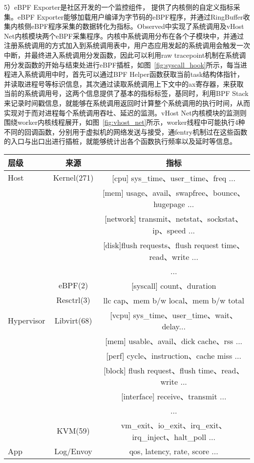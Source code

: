 5）eBPF Exporter是社区开发的一个监控组件， 提供了内核侧的自定义指标采集。eBPF Exporter能够加载用户编译为字节码的eBPF程序，并通过RingBuffer收集内核侧eBPF程序采集的数据转化为指标。Observed中实现了系统调用及vHost Net内核模块两个eBPF采集程序。内核中系统调用分布在各个子模块中，并通过注册系统调用的方式加入到系统调用表中，用户态应用发起的系统调用会触发一次中断，并最终进入系统调用分发函数，因此可以利用raw tracepoint机制在系统调用分发函数的开始与结束处进行eBPF插桩，如图~\ref{fig:syscall_hook}所示，每当进程进入系统调用中时，首先可以通过BPF Helper函数获取当前task结构体指针，并读取进程号等标识信息，其次通过读取系统调用上下文中的ax寄存器，来获取当前的系统调用号，这两个信息提供了基本的指标标签，基同时，利用BPF Stack来记录时间戳信息，就能够在系统调用返回时计算整个系统调用的执行时间，从而实现对于而对进程每个系统调用吞吐、延迟的监测。vHost Net内核模块的监测则围绕worker内核线程展开，如图~\ref{fig:vhost_net}所示，worker线程中可能执行4种不同的回调函数，分别用于虚拟机的网络发送与接受，通fentry机制过在这些函数的入口与出口出进行插桩，就能够统计出各个函数执行频率以及延时等信息。

\begin{table}[H]
    \label{tab:metric_list}
    \footnotesize%
    \setlength{\tabcolsep}{4pt}%
    \renewcommand{\arraystretch}{1.5}%
    \centering
    \begin{tabular}{lcc}
        \hline
        层级 & 来源 & 指标\\
        \hline
        Host & Kernel(271) & [cpu] sys\_time、user\_time、freq ... \\
        & & [mem] usage、avail、swapfree、bounce、hugepage ...\\
        & & [network] transmit、netstat、sockstat、ip、speed ...\\
        & & [disk]flush requests、flush request time、read、write ...\\
        & & ...\\
        & eBPF(2) & [syscall] count、duration\\
        & Resctrl(3) & llc cap、mem b/w local、mem b/w total\\
        Hypervisor & Libvirt(68) & [vcpu] sys\_time、user\_time、wait、delay...\\
        & & [mem] usable、avail、dick cache、rss ...\\
        & & [perf] cycle、instruction、cache miss ...\\
        & & [block] flush request、flush time、read、write ...\\
        & & [interface] receive、transmit ...\\
        & & ...\\
        & KVM(59) & vm\_exit、io\_exit、irq\_exit、irq\_inject、halt\_poll ...\\
        App & Log/Envoy & qos, latency, rate, score ...\\
        \hline
    \end{tabular}
\end{table}

